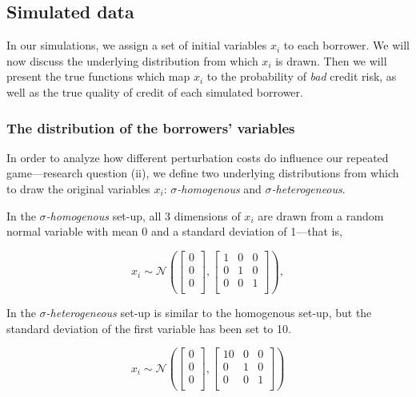 \documentclass[12pt]{article} %
\begin{document}
\subsection{Simulated data}
\label{sec:simulated_data}
In our simulations, we assign a set of initial variables $x_i$ to each borrower. We will now discuss the underlying distribution from which $x_i$ is drawn. Then we will present the true functions which map $x_i$ to the probability of \textit{bad} credit risk, as well as the true quality of credit of each simulated borrower. 

\subsubsection{The distribution of the borrowers' variables}
In order to analyze how different perturbation costs do influence our repeated game---research question (ii), we define two underlying distributions from which to draw the original variables $x_i$: \textit{$\sigma$-homogenous} and \textit{$\sigma$-heterogeneous}. 

In the \textit{$\sigma$-homogenous} set-up, all 3 dimensions of $x_i$ are drawn from a random normal variable with mean 0 and a standard deviation of 1---that is,

\begin{equation}\label{equ:homo_matrices}
x_i \sim \mathcal{N} \left( 
\left[\begin{array}{lll}
0\\
0\\
0\\
\end{array}\right]
,
\left[\begin{array}{lll}
1 & 0 & 0 \\
0 & 1 & 0 \\
0 & 0 & 1 \\
\end{array}\right]
\right),
\end{equation}

In the \textit{$\sigma$-heterogeneous} set-up is similar to the homogenous set-up, but the standard deviation of the first variable has been set to 10. 

\begin{equation}\label{equ:hetero_matrices}
x_i \sim \mathcal{N} \left( 
\left[\begin{array}{lll}
0\\
0\\
0\\
\end{array}\right]
,
\left[\begin{array}{lll}
10 & 0 & 0 \\
0 & 1 & 0 \\
0 & 0 & 1 \\
\end{array}\right]
\right)
\end{equation}
\end{document}
